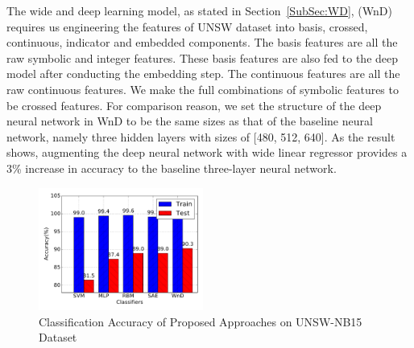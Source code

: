 The wide and deep learning model, as stated in Section~\ref{SubSec:WD},
(WnD) requires us engineering the features of UNSW dataset into
basis, crossed, continuous, indicator and embedded components.
The basis features are all the raw symbolic and integer features.
These basis features are also fed to the deep model after conducting the embedding step.
The continuous features are all the raw continuous features.
We make the full combinations of symbolic features to be crossed features.
For comparison reason, we set the structure of the deep neural network in WnD to be
the same sizes as that of the baseline neural network,
namely three hidden layers with sizes of [480, 512, 640].
As the result shows, augmenting the deep neural network with wide linear regressor
provides a 3\% increase in accuracy to the baseline three-layer neural network.

\begin{figure}[h]
    \centering
    \includegraphics[width=0.48\textwidth]{figures/comp_accuracy_unsw.pdf}
    \caption{Classification Accuracy of Proposed Approaches on UNSW-NB15 Dataset}
    \label{Fig:CompAccuracyUNSW}
\end{figure}
